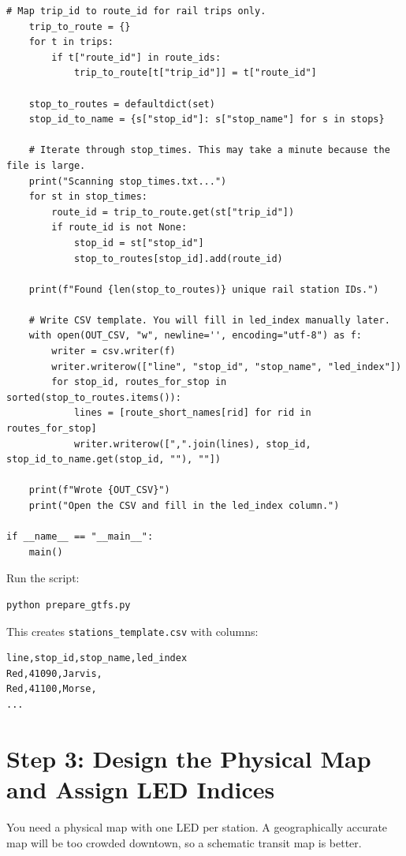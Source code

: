 \documentclass[11pt]{article}
\begin{document}
\begin{lstlisting}[style=python,caption={Python script to extract CTA rail stations from GTFS.},label={lst:prepare_gtfs}]
    # Map trip_id to route_id for rail trips only.
    trip_to_route = {}
    for t in trips:
        if t["route_id"] in route_ids:
            trip_to_route[t["trip_id"]] = t["route_id"]

    stop_to_routes = defaultdict(set)
    stop_id_to_name = {s["stop_id"]: s["stop_name"] for s in stops}

    # Iterate through stop_times. This may take a minute because the file is large.
    print("Scanning stop_times.txt...")
    for st in stop_times:
        route_id = trip_to_route.get(st["trip_id"])
        if route_id is not None:
            stop_id = st["stop_id"]
            stop_to_routes[stop_id].add(route_id)

    print(f"Found {len(stop_to_routes)} unique rail station IDs.")

    # Write CSV template. You will fill in led_index manually later.
    with open(OUT_CSV, "w", newline='', encoding="utf-8") as f:
        writer = csv.writer(f)
        writer.writerow(["line", "stop_id", "stop_name", "led_index"])
        for stop_id, routes_for_stop in sorted(stop_to_routes.items()):
            lines = [route_short_names[rid] for rid in routes_for_stop]
            writer.writerow([",".join(lines), stop_id, stop_id_to_name.get(stop_id, ""), ""])

    print(f"Wrote {OUT_CSV}")
    print("Open the CSV and fill in the led_index column.")

if __name__ == "__main__":
    main()
\end{lstlisting}

Run the script:

\begin{verbatim}
python prepare_gtfs.py
\end{verbatim}

This creates \texttt{stations\_template.csv} with columns:

\begin{verbatim}
line,stop_id,stop_name,led_index
Red,41090,Jarvis,
Red,41100,Morse,
...
\end{verbatim}

\section{Step 3: Design the Physical Map and Assign LED Indices}

You need a physical map with one LED per station. A geographically accurate map will be too crowded downtown, so a schematic transit map is better.
\end{document}
